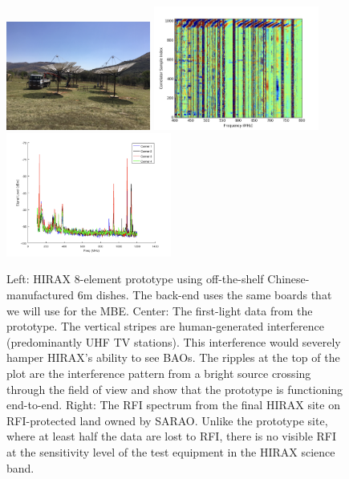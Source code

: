 \documentclass[letterpaper,11pt,preprint]{aastex}
\newcommand{\mbe}{{\rm MBE}}
\begin{document}


\begin{figure}[tbh]
  \includegraphics[height=1.4in]{hirax8.png}
  \includegraphics[height=1.6in]{first_fringe.png}
  \includegraphics[height=1.6in]{hirax_site_rfi.png} 
\caption{\small Left: HIRAX 8-element prototype using off-the-shelf
  Chinese-manufactured 6m dishes.  The back-end uses the same boards
  that we will use for the \mbe.  Center:  The first-light data from
  the prototype.  The vertical stripes are human-generated
  interference (predominantly UHF TV stations). This interference
  would severely hamper HIRAX's ability to see BAOs.  The ripples at
  the top of the plot are the interference pattern from a bright
  source crossing through the field of view and show that the
  prototype is functioning end-to-end.  Right:  The RFI spectrum from
  the final HIRAX site on RFI-protected land owned by SARAO.  Unlike
  the prototype site, where at least half the data are lost to RFI,
  there is no visible RFI at the sensitivity level of the test
  equipment in the HIRAX science band.
  \label{fig:hirax8}
}
\end{figure}
\end{document}
